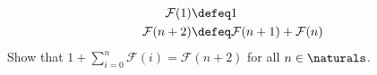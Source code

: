 \begin{enumerate}
\begin{align*}
        \mathcal{F}(1) &\defeq 1 \\
        \mathcal{F}(n + 2) &\defeq \mathcal{F}(n + 1) + \mathcal{F}(n)
    \end{align*}
    Show that $1 + \displaystyle\sum_{i = 0}^{n}\mathcal{F}(i) = \mathcal{F}(n + 2)$ for all $n \in \naturals$.

\end{enumerate}


